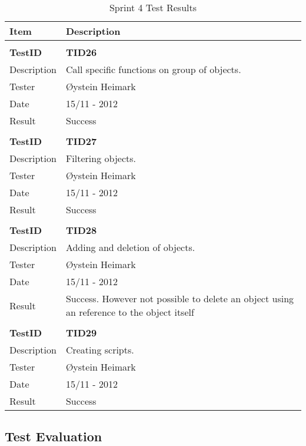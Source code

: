 \begin{table}
\caption{Sprint 4 Test Results}
\centering
\begin{tabular}{ l p{13cm} }

\hline 
Item			&Description		\\
\hline \\ [-2.0ex]

\bf{TestID}		&\bf{TID26}			\\
Description	&Call specific functions on group of objects.	\\
Tester		&Øystein Heimark	\\
Date			&15/11 - 2012	\\
Result		&Success				\\
\hline \\ [-2.0ex]

\bf{TestID}		&\bf{TID27}			\\
Description	&Filtering objects.  	\\
Tester		&Øystein Heimark	\\
Date			&15/11 - 2012	\\
Result		&Success			\\
\hline \\ [-2.0ex]

\bf{TestID}		&\bf{TID28}			\\
Description	&Adding and deletion of objects.	\\
Tester		&Øystein Heimark	\\
Date			&15/11 - 2012	\\
Result		&Success. However not possible to delete an object using an reference to the object itself	\\
\hline \\ [-2.0ex]

\bf{TestID}		&\bf{TID29}			\\
Description	&Creating scripts.	\\
Tester		&Øystein Heimark	\\
Date			&15/11 - 2012	\\
Result		&Success			\\
\hline

\end{tabular}
\label{table:sp4testresults}
\end{table}

\subsection{Test Evaluation}

